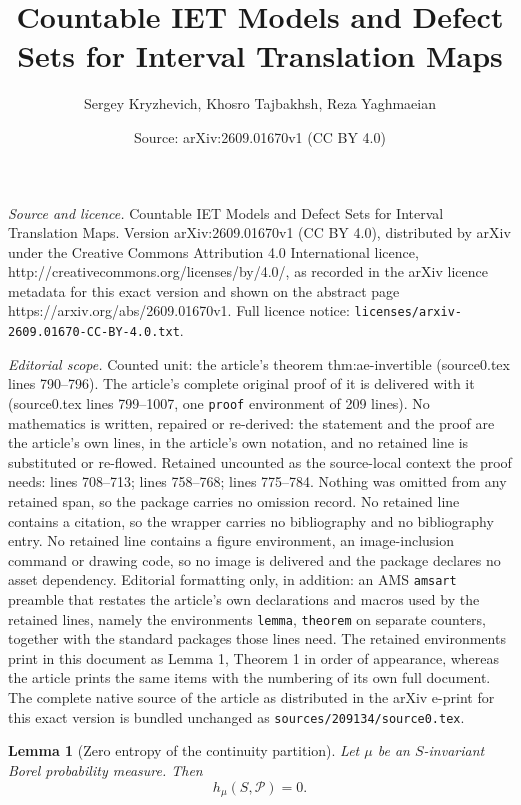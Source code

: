\documentclass[10pt,a4paper]{amsart}
\title{Countable IET Models and Defect Sets for Interval Translation Maps}
\author{Sergey Kryzhevich, Khosro Tajbakhsh, Reza Yaghmaeian}
\date{Source: arXiv:2609.01670v1 (CC BY 4.0)}
\newtheorem{lemma}{Lemma}
\newcommand{\cP}{\mathcal P}
\begin{document}
\maketitle

\noindent\emph{Source and licence.} Countable IET Models and Defect Sets for Interval Translation Maps. Version arXiv:2609.01670v1 (CC BY 4.0), distributed by arXiv under the Creative Commons Attribution 4.0 International licence, http://creativecommons.org/licenses/by/4.0/, as recorded in the arXiv licence metadata for this exact version and shown on the abstract page https://arxiv.org/abs/2609.01670v1. Full licence notice: \texttt{licenses/arxiv-2609.01670-CC-BY-4.0.txt}.\par\smallskip

\noindent\textit{Editorial scope.} Counted unit: the article's theorem thm:ae-invertible (source0.tex lines 790--796). The article's complete original proof of it is delivered with it (source0.tex lines 799--1007, one \texttt{proof} environment of 209 lines). No mathematics is written, repaired or re-derived: the statement and the proof are the article's own lines, in the article's own notation, and no retained line is substituted or re-flowed.  Retained uncounted as the source-local context the proof needs: lines 708--713; lines 758--768; lines 775--784.  Nothing was omitted from any retained span, so the package carries no omission record.  No retained line contains a citation, so the wrapper carries no bibliography and no bibliography entry.  No retained line contains a figure environment, an image-inclusion command or drawing code, so no image is delivered and the package declares no asset dependency.  Editorial formatting only, in addition: an AMS \texttt{amsart} preamble that restates the article's own declarations and macros used by the retained lines, namely the environments \texttt{lemma}, \texttt{theorem} on separate counters, together with the standard packages those lines need.  The retained environments print in this document as Lemma 1, Theorem 1 in order of appearance, whereas the article prints the same items with the numbering of its own full document.  The complete native source of the article as distributed in the arXiv e-print for this exact version is bundled unchanged as \texttt{sources/209134/source0.tex}.
\begin{lemma}[Zero entropy of the continuity partition]\label{lem:zero-partition-entropy}
Let $\mu$ be an $S$-invariant Borel probability measure. Then
\[
        h_\mu(S,\cP)=0.
\]
\end{lemma}
\end{document}
